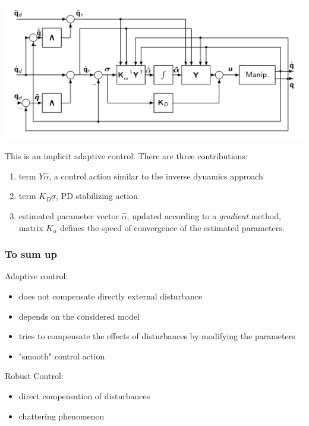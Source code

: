 \documentclass{book}
\begin{document}
\includegraphics[width=\textwidth]{adapctrl}

This is an implicit adaptive control. There are three contributions: 
\begin{enumerate}
    \item term $Y\hat{\alpha}$, a control action similar to the inverse dynamics approach 
        \item term $K_D\sigma$, PD stabilizing action 
        \item estimated parameter vector $\hat{\alpha}$, updated according to a \emph{gradient} method, matrix $K_\alpha$ defines the speed of convergence of the estimated parameters.
\end{enumerate}
\subsubsection{To sum up}

Adaptive control:
\begin{itemize}
    \item does not compensate directly external disturbance
    \item depends on the considered model 
    \item tries to compensate the effects of disturbances by modifying the parameters 
    \item "smooth" control action
\end{itemize}

Robust Control:
\begin{itemize}
    \item direct compensation of disturbances 
    \item chattering phenomenon
\end{itemize}
\end{document}
